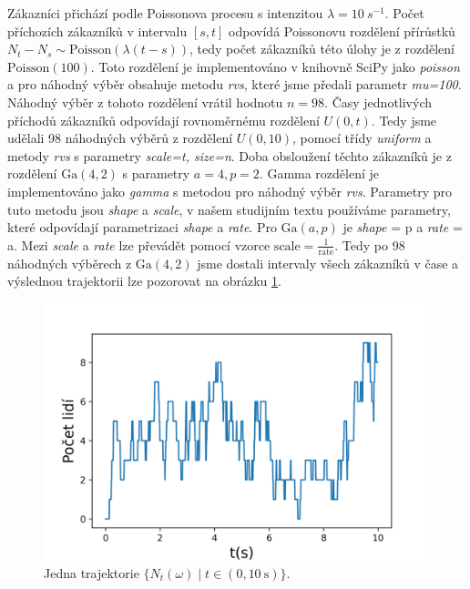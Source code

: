 \documentclass[czech]{mvi-report}
\begin{document}
Zákazníci přichází podle Poissonova procesu s intenzitou $ \lambda = 10~s^{-1} $. Počet příchozích zákazníků v intervalu $ [s,t] $ odpovídá Poissonovu rozdělení přírůstků $ N_t - N_s \sim \textrm{Poisson}(\lambda (t-s)) $, tedy počet zákazníků této úlohy je z rozdělení $ \textrm{Poisson}(100) $. Toto rozdělení je implementováno v knihovně SciPy jako \textit{poisson} a pro náhodný výběr obsahuje metodu \textit{rvs}, které jsme předali parametr \textit{mu=100}. Náhodný výběr z tohoto rozdělení vrátil hodnotu $  n=98 $. Časy jednotlivých příchodů zákazníků odpovídají rovnoměrnému rozdělení $ U(0,t) $. Tedy jsme udělali 98 náhodných výběrů z rozdělení $ U(0,10) $, pomocí třídy \textit{uniform} a metody \textit{rvs} s parametry \textit{scale=t, size=n}. Doba obsloužení těchto zákazníků je z rozdělení $\mathrm{Ga}(4,2)$ s parametry $ a = 4, p = 2 $. Gamma rozdělení je implementováno jako \textit{gamma} s metodou pro náhodný výběr \textit{rvs}. Parametry pro tuto metodu jsou \textit{shape} a \textit{scale}, v našem studijním textu používáme parametry, které odpovídají parametrizaci \textit{shape} a \textit{rate}. Pro $ \mathrm{Ga}(a,p) $ je \textit{shape} = p a \textit{rate} = a. Mezi \textit{scale} a \textit{rate} lze převádět pomocí vzorce $\mathrm{scale}=\frac{1}{\mathrm{rate}} $. Tedy po 98 náhodných výběrech z $\mathrm{Ga}(4,2)$ jsme dostali intervaly všech zákazníků v čase a výslednou trajektorii lze pozorovat na obrázku \ref{fig:traj}.

\begin{figure}
\includegraphics[width=\columnwidth]{img/traj.png} 
\caption{Jedna trajektorie $ \{N_t(\omega) \mid t\in(0,10~\mathrm{s})\} $.}
\label{fig:traj}
\end{figure}
\end{document}
